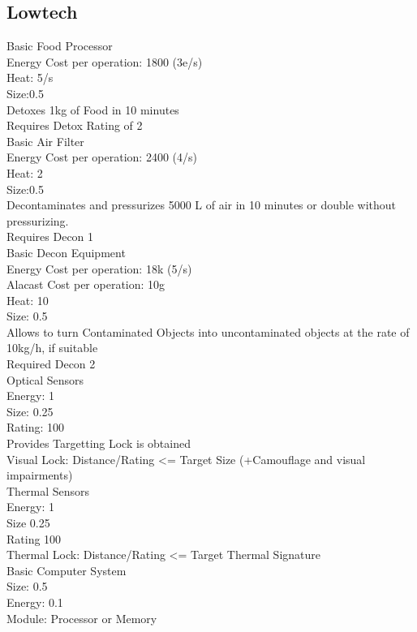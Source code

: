 \documentclass{article}
\begin{document}
    \subsection{Lowtech}
    Basic Food Processor\\
    Energy Cost per operation: 1800 (3e/s)\\
    Heat: 5/s \\
    Size:0.5\\
    Detoxes 1kg of Food in 10 minutes \\
    Requires Detox Rating of 2\\
    \newline
    Basic Air Filter\\
    Energy Cost per operation: 2400 (4/s)\\
    Heat: 2\\
    Size:0.5\\
    Decontaminates and pressurizes 5000 L of air in  10 minutes or double without pressurizing. \\
    Requires Decon 1\\
    \newline
    Basic Decon Equipment \\
    Energy Cost per operation: 18k (5/s)\\
    Alacast Cost per operation: 10g\\
    Heat: 10 \\
    Size: 0.5\\
    Allows to turn Contaminated Objects into uncontaminated objects at the rate of 10kg/h, if suitable\\
    Required Decon 2\\
    \newline
    Optical Sensors\\
    Energy: 1\\
    Size: 0.25 \\
    Rating: 100\\
    Provides Targetting Lock is obtained\\
    Visual Lock: Distance/Rating <= Target Size (+Camouflage and visual impairments)\\
    \newline
    Thermal Sensors\\
    Energy: 1\\
    Size 0.25\\
    Rating 100\\
    Thermal Lock: Distance/Rating <= Target Thermal Signature\\
    \newline
    Basic Computer System\\
    Size: 0.5\\
    Energy: 0.1\\
    Module: Processor or Memory\\
    \newline
\end{document}
